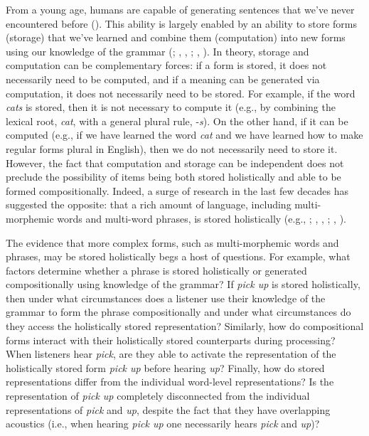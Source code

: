 \documentclass[
  12pt,
  letterpaper,
]{scrreprt}
\begin{document}
From a young age, humans are capable of generating sentences that we've
never encountered before
(). This
ability is largely enabled by an ability to store forms (storage) that
we've learned and combine them (computation) into new forms using our
knowledge of the grammar
(;
,
,
;
,
). In theory,
storage and computation can be complementary forces: if a form is
stored, it does not necessarily need to be computed, and if a meaning
can be generated via computation, it does not necessarily need to be
stored. For example, if the word \emph{cats} is stored, then it is not
necessary to compute it (e.g., by combining the lexical root,
\emph{cat}, with a general plural rule, -\emph{s}). On the other hand,
if it can be computed (e.g., if we have learned the word \emph{cat} and
we have learned how to make regular forms plural in English), then we do
not necessarily need to store it. However, the fact that computation and
storage can be independent does not preclude the possibility of items
being both stored holistically and able to be formed compositionally.
Indeed, a surge of research in the last few decades has suggested the
opposite: that a rich amount of language, including multi-morphemic
words and multi-word phrases, is stored holistically (e.g.,
; , ,
;
,
).

The evidence that more complex forms, such as multi-morphemic words and
phrases, may be stored holistically begs a host of questions. For
example, what factors determine whether a phrase is stored holistically
or generated compositionally using knowledge of the grammar? If
\emph{pick up} is stored holistically, then under what circumstances
does a listener use their knowledge of the grammar to form the phrase
compositionally and under what circumstances do they access the
holistically stored representation? Similarly, how do compositional
forms interact with their holistically stored counterparts during
processing? When listeners hear \emph{pick}, are they able to activate
the representation of the holistically stored form \emph{pick up} before
hearing \emph{up}? Finally, how do stored representations differ from
the individual word-level representations? Is the representation of
\emph{pick up} completely disconnected from the individual
representations of \emph{pick} and \emph{up}, despite the fact that they
have overlapping acoustics (i.e., when hearing \emph{pick up} one
necessarily hears \emph{pick} and \emph{up})?
\end{document}
